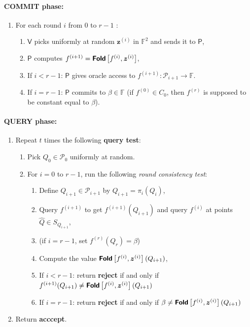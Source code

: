 \documentclass[a4paper,USenglish,autoref]{lipics-v2021}
\renewcommand\hat{\widehat}
\newcommand\F{\mathbb{F}}
\newcommand\fold[1]{\textsf{\textbf{Fold}}\left[#1\right]}
\renewcommand{\hat}{\widehat}
\newcommand\prover{\mathsf{P}}
\newcommand\verifier{\mathsf{V}}
\renewcommand{\vec}[1]{\boldsymbol{#1}}
\newcommand\bfz{{\vec{z}}}
\newcommand\calP{\mathcal{P}}
\newcommand\xpi[1]{#1^{(i)}}
\newcommand\xpip[1]{#1^{(i+1)}}
\begin{document}
\paragraph*{\textsf{COMMIT} phase:}
\begin{enumerate}
	\item For each round $i$ from 0 to  $r-1$ :
	\begin{enumerate}
		\item $\verifier$ picks uniformly at random $\bfz^{(i)}$ in $\F^2$ and sends it to $\prover$,
		\item $\prover$ computes $\xpip{f} = \fold{\xpi{f}, \xpi{\bfz}}$,
		\item If $i < r - 1$: $\prover$ gives oracle access to $f^{(i + 1)} : \calP_{i + 1} \rightarrow \F$.
		\item If $i = r - 1$: $\prover$ commits to $\beta \in \F$ (if $f^{(0)} \in C_0$, then $f^{(r)}$ is supposed to be constant equal to $\beta$).                
	\end{enumerate}
\end{enumerate}

\paragraph*{\textsf{QUERY} phase:}
\begin{enumerate}
	\item Repeat $t$ times the following \textbf{\textsf{query test}}: 
	\begin{enumerate}
		\item Pick $Q_0 \in \calP_0$ uniformly at random.
		\item For $i = 0$ to $r - 1$, run the following \emph{round consistency test}:
		\begin{enumerate}
			\item Define $Q_{i + 1} \in \calP_{i + 1}$ by $Q_{i + 1} = \pi_i(Q_i)$,
			\item Query $f^{(i+1)}$ to get $f^{(i+1)}(Q_{i+1})$ and query $f^{(i)}$ at points $\hat Q \in S_{Q_{i+1}}$,
			\item[] (if $i = r -1$, set $f^{(r)}(Q_{r}) = \beta$)
			\item Compute the value $\fold{\xpi{f}, \bfz^{(i)}}(Q_{i+1})$,
			\item If $i < r - 1$: return \textsf{\textbf{reject}} if and only if $f^{(i+1)}(Q_{i+1}) \neq \fold{f^{(i)}, \bfz^{(i)}}(Q_{i+1})$
			\item If $i = r - 1$: return \textsf{\textbf{reject}} if and only if $\beta \neq \fold{f^{(i)}, \bfz^{(i)}}(Q_{i+1})$
		\end{enumerate}
	\end{enumerate}
	\item Return \textsf{\textbf{acccept}}. 
\end{enumerate}
\end{document}
